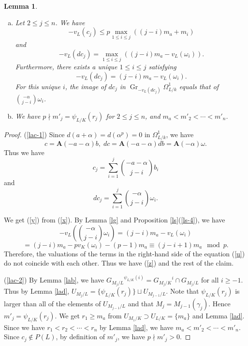 \documentclass[10pt,a4paper]{amsart}
\numberwithin{equation}{section}
\newcommand{\Gr}{\operatorname{Gr}}
\theoremstyle{plain}
\newtheorem{lemm}[theo]{Lemma}
\theoremstyle{definition}
\begin{document}
  \begin{lemm}\label{lac}
  \begin{enumerate}[(a)]
    \item\label{lac-1} Let $2\leq j\leq n$. We have
  \begin{equation}\label{y}
  -v_L(c_j)\leq p\max_{1\leq i\leq j}((j-i)m_a+m_i)
  \end{equation}
  and
  \begin{equation}\label{z}
  -v_L(dc_j)=\max_{1\leq i\leq j}((j-i)m_a-v_L(\omega_i)).
  \end{equation}
  Furthermore, there exists a unique $1\leq i\leq j$ satisfying
  \begin{equation}\label{za}
    -v_L(dc_j)=(j-i)m_a-v_L(\omega_i).
  \end{equation}
  For this unique $i$, the image of $dc_j$ in $\Gr_{-v_L(dc_j)}\Omega_{L/k}^1$ equals that of $\displaystyle{\binom{-\alpha}{j-i}\omega_i}$.
\item\label{lac-2} We have $p\nmid m'_j=\psi_{L/K}(r_j)$ for $2\leq j\leq n$, and $m_a<m'_2<\cdots<m'_n$.
  \end{enumerate}
\end{lemm}

\begin{proof}
  (\ref{lac-1}) Since
$d(a+\alpha)=d(\alpha^p)=0$ in $\Omega_{L/k}^1$, we have
\begin{equation}
c=\mathbf{A}(-a-\alpha)b,\;dc=\mathbf{A}(-a-\alpha)db=\mathbf{A}(-\alpha)\omega.
\end{equation}
Thus we have
\begin{equation}\label{x}
  c_j=\sum_{i=1}^j\binom{-a-\alpha}{j-i}b_i
\end{equation}
and
\begin{equation}\label{u}
dc_j=\sum_{i=1}^j\binom{-\alpha}{j-i}\omega_i.
\end{equation}

We get (\ref{y}) from (\ref{x}). By Lemma \ref{lg} and Proposition \ref{ls}(\ref{ls-4}), we have
\[
-v_L\left(\binom{-\alpha}{j-i}\omega_i\right)=(j-i)m_a-v_L(\omega_i)
\]
\begin{equation}
=(j-i)m_a-pv_K(\omega_i)-(p-1)m_a\equiv(j-i+1)m_a\mod p.
\end{equation}
Therefore, the valuations of the terms in the right-hand side of the equation (\ref{u}) do not coincide with each other. Thus we have (\ref{z}) and the rest of the claim.


(\ref{lac-2}) By Lemma \ref{lab}, we have ${G_{M_j/L}}^{\psi_{L/K}(i)}={G_{M_j/K}}^{i}\cap G_{M_j/L}$ for all $i\geq -1$. Thus by Lemma \ref{lad}, $U_{M_j/L}=\{\psi_{L/K}(r_j)\}\sqcup U_{M_{j-1}/L}$. Note that $\psi_{L/K}(r_j)$ is larger than all of the elements of $U_{M_{j-1}/L}$ and that $M_j=M_{j-1}(\gamma_j)$. Hence $m'_j=\psi_{L/K}(r_j)$. We get $r_1\geq m_a$ from $U_{M_1/K}\supset U_{L/K}=\{m_a\}$ and Lemma \ref{lad}. Since we have $r_1<r_2<\cdots<r_n$ by Lemma \ref{lad}, we have $m_a<m'_2<\cdots<m'_n$. Since $c_j\notin P(L)$, by definition of $m'_j$, we have $p\nmid m'_j>0$.
\end{proof}
\end{document}
